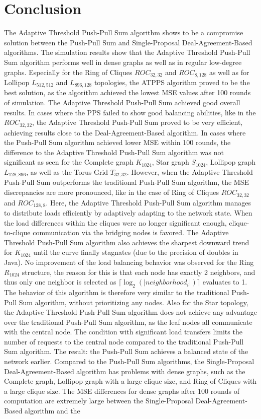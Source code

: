 \chapter{Conclusion}\label{chap:conclusion}
The Adaptive Threshold Push-Pull Sum algorithm shows to be a compromise solution between the Push-Pull Sum and Single-Proposal Deal-Agreement-Based algorithms. The simulation results show that the Adaptive Threshold Push-Pull Sum algorithm performs well in dense graphs as well as in regular low-degree graphs. Especially for the Ring of Cliques $ROC_{32,32}$ and $ROC_{8,128}$ as well as for Lollipop $L_{512,512}$ and $L_{896,128}$ topologies, the ATPPS algorithm proved to be the best solution, as the algorithm achieved the lowest MSE values after 100 rounds of simulation. The Adaptive Threshold Push-Pull Sum achieved good overall results. In cases where the PPS failed to show good balancing abilities, like in the $ROC_{32,32}$, the Adaptive Threshold Push-Pull Sum proved to be very efficient, achieving results close to the Deal-Agreement-Based algorithm. In cases where the Push-Pull Sum algorithm achieved lower MSE within 100 rounds, the difference to the Adaptive Threshold Push-Pull Sum algorithm was not significant as seen for the Complete graph $K_{1024}$, Star graph $S_{1024}$, Lollipop graph $L_{128,896}$, as well as the Torus Grid $T_{32,32}$. However, when the Adaptive Threshold Push-Pull Sum outperforms the traditional Push-Pull Sum algorithm, the MSE discrepancies are more pronounced, like in the case of Ring of Cliques $ROC_{32,32}$ and $ROC_{128,8}$. Here, the Adaptive Threshold Push-Pull Sum algorithm manages to distribute loads efficiently by adaptively adapting to the network state. When the load differences within the cliques were no longer significant enough, clique-to-clique communication via the bridging nodes is favored. The Adaptive Threshold Push-Pull Sum algorithm also achieves the sharpest downward trend for $K_{1024}$ until the curve finally stagnates (due to the precision of doubles in Java). No improvement of the load balancing behavior was observed for the Ring $R_{1024}$ structure, the reason for this is that each node has exactly 2 neighbors, and thus only one neighbor is selected as $\lceil\log_{2}{(|neighborhood_{i}|)}\rceil$ evaluates to 1. The behavior of this algorithm is therefore very similar to the traditional Push-Pull Sum algorithm, without prioritizing any nodes. Also for the Star topology, the Adaptive Threshold Push-Pull Sum algorithm does not achieve any advantage over the traditional Push-Pull Sum algorithm, as the leaf nodes all communicate with the central node. The condition with significant load transfers limits the number of requests to the central node compared to the traditional Push-Pull Sum algorithm. The result: the Push-Pull Sum achieves a balanced state of the network earlier. Compared to the Push-Pull Sum algorithms, the Single-Proposal Deal-Agreement-Based algorithm has problems with dense graphs, such as the Complete graph, Lollipop graph with a large clique size, and Ring of Cliques with a large clique size. The MSE differences for dense graphs after 100 rounds of computation are extremely large between the Single-Proposal Deal-Agreement-Based algorithm and the 
